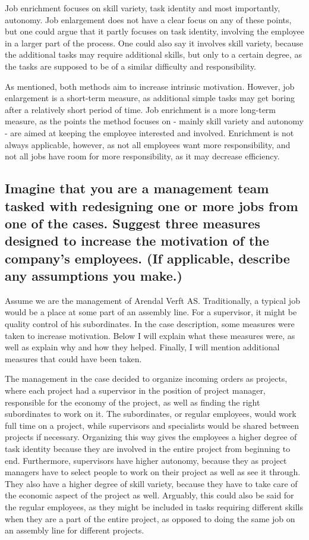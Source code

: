 \documentclass[a4paper]{article}
\begin{document}
    Job enrichment focuses on skill variety, task identity and most
    importantly, autonomy. Job enlargement does not have a clear focus on
    any of these points, but one could argue that it partly focuses on task
    identity, involving the employee in a larger part of the process. One
    could also say it involves skill variety, because the additional tasks may
    require additional skills, but only to a certain degree, as the tasks are
    supposed to be of a similar difficulty and responsibility.

    As mentioned, both methods aim to increase intrinsic motivation. However,
    job enlargement is a short-term measure, as additional simple tasks may
    get boring after a relatively short period of time. Job enrichment is
    a more long-term measure, as the points the method focuses on - mainly
    skill variety and autonomy - are aimed at keeping the employee interested
    and involved. Enrichment is not always applicable, however, as not all
    employees want more responsibility, and not all jobs have room for more
    responsibility, as it may decrease efficiency.

    \subsection*{Imagine that you are a management team tasked with
    redesigning one or more jobs from one of the cases. Suggest three measures
    designed to increase the motivation of the company's employees. (If
    applicable, describe any assumptions you make.)}

    Assume we are the management of Arendal Verft AS. Traditionally, a typical
    job would be a place at some part of an assembly line. For a supervisor,
    it might be quality control of his subordinates. In the case description,
    some measures were taken to increase motivation. Below I will explain what
    these measures were, as well as explain why and how they helped. Finally,
    I will mention additional measures that could have been taken.

    The management in the case decided to organize incoming orders as
    projects, where each project had a supervisor in the position of project
    manager, responsible for the economy of the project, as well as finding
    the right subordinates to work on it. The subordinates, or regular
    employees, would work full time on a project, while supervisors and
    specialists would be shared between projects if necessary. Organizing this
    way gives the employees a higher degree of task identity because they
    are involved in the entire project from beginning to end. Furthermore,
    supervisors have higher autonomy, because they as project managers have
    to select people to work on their project as well as see it through. They
    also have a higher degree of skill variety, because they have to take care
    of the economic aspect of the project as well. Arguably, this could also
    be said for the regular employees, as they might be included in tasks
    requiring different skills when they are a part of the entire project, as
    opposed to doing the same job on an assembly line for different projects.
\end{document}
